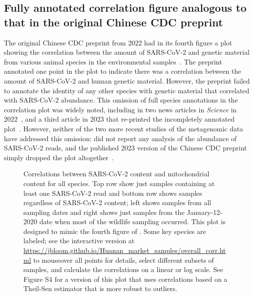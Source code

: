 \documentclass[9pt,twocolumn,twoside]{gsajnl_modified}
\begin{document}
\subsection{Fully annotated correlation figure analogous to that in the original Chinese CDC preprint}
The original Chinese CDC preprint from 2022 had in its fourth figure a plot showing the correlation between the amount of SARS-CoV-2 and genetic material from various animal species in the environmental samples~\citep{liu2022surveillance}.
The preprint annotated one point in the plot to indicate there was a correlation between the amount of SARS-CoV-2 and human genetic material.
However, the preprint failed to annotate the identity of any other species with genetic material that correlated with SARS-CoV-2 abundance.
This omission of full species annotations in the correlation plot was widely noted, including in two news articles in \textit{Science} in 2022~\citep{cohen2022anywhere,cohen2022studies}, and a third article in 2023 that re-printed the incompletely annotated plot~\citep{cohen2023unearthed}.
However, neither of the two more recent studies of the metagenomic data have addressed this omission: \citet{crits2023genetic} did not report any analysis of the abundance of SARS-CoV-2 reads, and the published 2023 version of the Chinese CDC preprint simply dropped the plot altogether~\citep{liu2023surveillance}.

\begin{figure}
\caption{
Correlations between SARS-CoV-2 content and mitochondrial content for all species.
Top row show just samples containing at least one SARS-CoV-2 read and bottom row shows samples regardless of SARS-CoV-2 content; left shows samples from all sampling dates and right shows just samples from the January-12-2020 date when most of the wildlife sampling occurred.
This plot is designed to mimic the fourth figure of \citet{liu2022surveillance}.
Some key species are labeled; see the interactive version at \url{https://jbloom.github.io/Huanan_market_samples/overall_corr.html} to mouseover all points for details, select different subsets of samples, and calculate the correlations on a linear or log scale.
See Figure S4 for a version of this plot that uses correlations based on a Theil-Sen estimator that is more robust to outliers.
\label{fig:overall_corr}
}
\end{figure}
\end{document}
